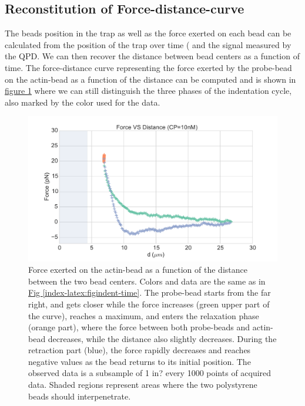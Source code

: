 \documentclass[A4paperpaper,11pt,english]{sphinxmanual}
\begin{document}
\subsection{Reconstitution of Force-distance-curve}
\label{index-latex:reconstitution-of-force-distance-curve}
The beads position in the trap as well as the force exerted on each bead can be
calculated from the position of the trap over time ( and the signal measured by the QPD. We can then recover the distance between bead centers as a function
of time.  The force-distance curve representing the force exerted by the
probe-bead on the actin-bead as a function of the distance can be computed and is
shown in \hyperref[index-latex:force-distance]{figure  \ref*{index-latex:force-distance}} where we can still distinguish the three
phases of the indentation cycle, also marked by the color used for the data.
\begin{figure}[htbp]
\centering
\capstart

\includegraphics[width=0.800\linewidth]{force-distance.pdf}
\caption{Force exerted on the actin-bead as a function of the distance between the
two bead centers. Colors and data are the same as in \hyperref[index-latex:figindent-time]{Fig  \ref*{index-latex:figindent-time}}.
The probe-bead starts from the far right, and gets closer
while the force increases (green upper part of the curve), reaches a
maximum, and enters the relaxation phase (orange part), where the force
between both probe-beads and actin-bead decreases, while the distance  also
slightly decreases. During the retraction part (blue), the force rapidly
decreases and  reaches negative values as   the bead returns to its initial
position. The observed data is a subsample of 1 in? every 1000 points of acquired
data. Shaded regions represent areas where the two polystyrene beads should
interpenetrate.}\label{index-latex:force-distance}\end{figure}
\end{document}
